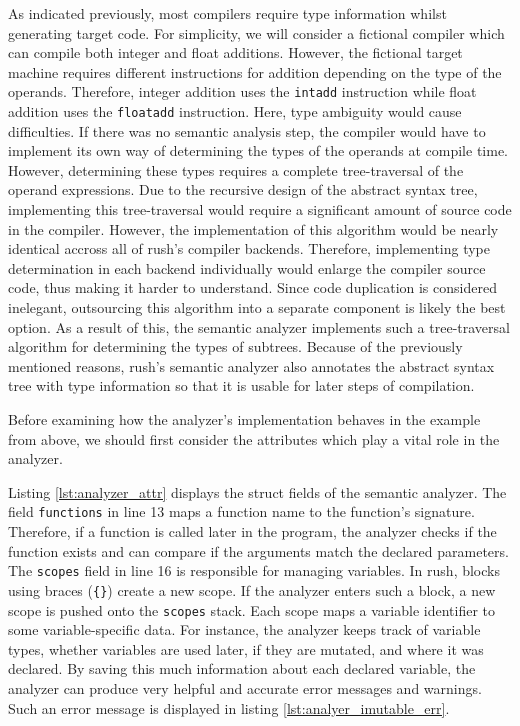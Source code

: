 As indicated previously, most compilers require type information whilst
generating target code. For simplicity, we will consider a fictional compiler
which can compile both integer and float additions. However, the fictional
target machine requires different instructions for addition depending on the
type of the operands. Therefore, integer addition uses the \texttt{intadd} instruction
while float addition uses the \texttt{floatadd} instruction. Here, type ambiguity would
cause difficulties. If there was no semantic analysis step, the compiler would
have to implement its own way of determining the types of the operands at
compile time. However, determining these types requires a complete
tree-traversal of the operand expressions. Due to the recursive design of the
abstract syntax tree, implementing this tree-traversal would require a
significant amount of source code in the compiler. However, the implementation
of this algorithm would be nearly identical accross all of rush's compiler
backends. Therefore, implementing type determination in each backend
individually would enlarge the compiler source code, thus making it harder to
understand. Since code duplication is considered inelegant, outsourcing this
algorithm into a separate component is likely the best option. As a result of
this, the semantic analyzer implements such a tree-traversal algorithm for
determining the types of subtrees. Because of the previously mentioned reasons,
rush's semantic analyzer also annotates the abstract syntax tree with type
information so that it is usable for later steps of compilation.


Before examining how the analyzer's implementation behaves in the example from above,
we should first consider the attributes which play a vital role in the analyzer.


Listing \ref{lst:analyzer_attr} displays the struct fields of the semantic analyzer.
The field \texttt{functions} in line 13 maps a function name to the function's signature.
Therefore, if a function is called later in the program, the analyzer checks if the function exists and can compare if the arguments match the declared parameters.
The \texttt{scopes} field in line 16 is responsible for managing variables.
In rush, blocks using braces (\texttt{\{\}}) create a new scope.
If the analyzer enters such a block, a new scope is pushed onto the \texttt{scopes} stack.
Each scope maps a variable identifier to some variable-specific data.
For instance, the analyzer keeps track of variable types, whether variables are used later, if they are mutated, and where it was declared.
By saving this much information about each declared variable, the analyzer can produce very helpful and accurate error messages and warnings.
Such an error message is displayed in listing \ref{lst:analyer_imutable_err}.

